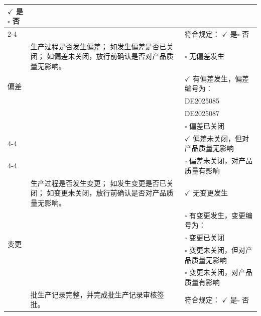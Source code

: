 \documentclass[UTF8,10pt,a4paper,fontset=fandol]{ctexart}
\newcommand{\fieldvalue}[1]{#1}
\newcommand{\handwritten}[1]{#1}
\let\mathcheckmark\checkmark
\renewcommand{\checkmark}{\ensuremath{\mathcheckmark}}
\begin{document}
\begin{tabularx}{\textwidth}{|p{2.2cm}|X|p{2.2cm}|p{2.2cm}|}
\fieldvalue{\(\checkmark\) 是}\quad $\square$ 否
\\ \cline{2-4}
& \multicolumn{2}{l|}{}
& 符合规定：
\fieldvalue{\(\checkmark\) 是}\quad $\square$ 否
\\ \hline
\multirow{5}{*}{偏差}
& \multicolumn{2}{l|}{生产过程是否发生偏差；\newline
如发生偏差是否已关闭；\newline
如偏差未关闭，放行前确认是否对产品质量无影响。}
& $\square$ 无偏差发生\\
& & &
\fieldvalue{\(\checkmark\) 有偏差发生，\newline 偏差编号为：}
\\ \cline{4-4}
& \multicolumn{2}{l|}{}
&
\fieldvalue{\handwritten{DE2025085}}
\\ \cline{4-4}
& \multicolumn{2}{l|}{}
&
\fieldvalue{\handwritten{DE2025087}}
\\ \cline{4-4}
& \multicolumn{2}{l|}{}
& $\square$ 偏差已关闭
\\ \cline{4-4}
& \multicolumn{2}{l|}{}
&
\fieldvalue{\(\checkmark\) 偏差未关闭，但对产品质量无影响}
\\ \cline{4-4}
& \multicolumn{2}{l|}{}
& $\square$ 偏差未关闭，对产品质量有影响
\\ \hline
\multirow{6}{*}{变更}
& \multicolumn{2}{l|}{生产过程是否发生变更；\newline
如发生变更是否已关闭；\newline
如变更未关闭，放行前确认是否对产品质量无影响。}
&
\fieldvalue{\(\checkmark\) 无变更发生}
\\ \cline{4-4}
& \multicolumn{2}{l|}{}
& $\square$ 有变更发生，变更编号为：
\\ \cline{4-4}
& \multicolumn{2}{l|}{}
& $\square$ 变更已关闭
\\ \cline{4-4}
& \multicolumn{2}{l|}{}
& $\square$ 变更未关闭，但对产品质量无影响
\\ \cline{4-4}
& \multicolumn{2}{l|}{}
& $\square$ 变更未关闭，对产品质量有影响
\\ \hline
记录完整性检查
& \multicolumn{2}{l|}{批生产记录完整，并完成批生产记录审核签批。}
& 符合规定：
\fieldvalue{\(\checkmark\) 是}\quad $\square$ 否
\\ \hline
\end{tabularx}
\end{document}

